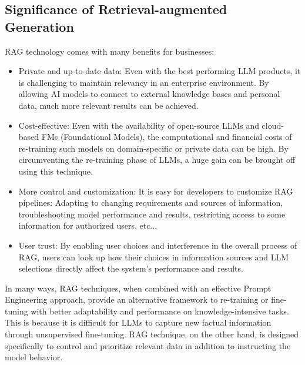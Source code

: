 \subsection{Significance of Retrieval-augmented Generation}
RAG technology comes with many benefits for businesses:
\begin{itemize}
    \item Private and up-to-date data: Even with the best performing LLM products, it is challenging to maintain relevancy in an enterprise environment. By allowing AI models to connect to external knowledge bases and personal data, much more relevant results can be achieved.
    \item Cost-effective: Even with the availability of open-source LLMs and cloud-based FMs (Foundational Models), the computational and financial costs of re-training such models on domain-specific or private data can be high. By circumventing the re-training phase of LLMs, a huge gain can be brought off using this technique.
    \item More control and customization: It is easy for developers to customize RAG pipelines: Adapting to changing requirements and sources of information, troubleshooting model performance and results, restricting access to some information for authorized users, etc...
    \item User trust: By enabling user choices and interference in the overall process of RAG, users can look up how their choices in information sources and LLM selections directly affect the system's performance and results.
\end{itemize}
In many ways, RAG techniques, when combined with an effective Prompt Engineering approach, provide an alternative framework to re-training or fine-tuning with better adaptability and performance on knowledge-intensive tasks. This is because it is difficult for LLMs to capture new factual information through unsupervised fine-tuning. RAG technique, on the other hand, is designed specifically to control and prioritize relevant data in addition to instructing the model behavior.
\newpage

